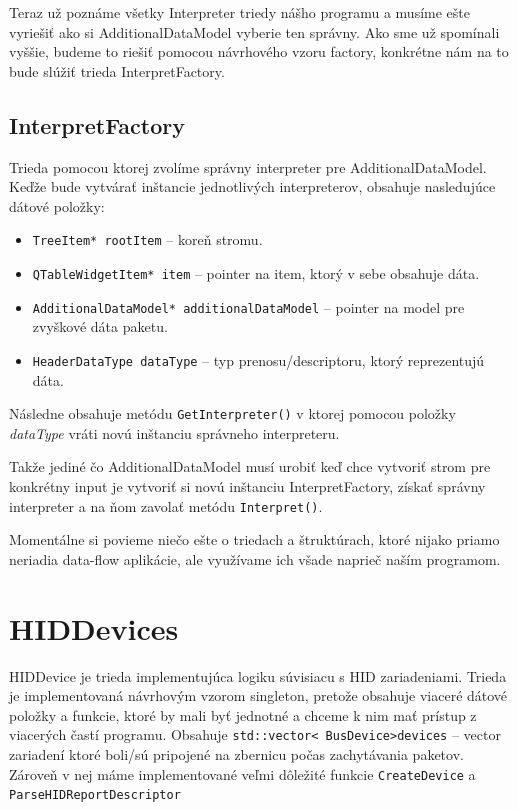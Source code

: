 Teraz už poznáme všetky Interpreter triedy nášho programu a musíme ešte vyriešiť ako si AdditionalDataModel vyberie ten správny. Ako sme už spomínali vyššie, budeme to riešiť pomocou návrhového vzoru factory, konkrétne nám na to bude slúžiť trieda InterpretFactory.

\subsection{InterpretFactory}
Trieda pomocou ktorej zvolíme správny interpreter pre AdditionalDataModel. Keďže bude vytvárať inštancie jednotlivých interpreterov, obsahuje nasledujúce dátové položky:
\begin{itemize}
\item \texttt{TreeItem* rootItem} -- koreň stromu.
\item \texttt{QTableWidgetItem* item} -- pointer na item, ktorý v sebe obsahuje dáta.
\item \texttt{AdditionalDataModel* additionalDataModel} -- pointer na model pre zvyškové dáta paketu.
\item \texttt{HeaderDataType dataType} -- typ prenosu/descriptoru, ktorý reprezentujú dáta.
\end{itemize}
Následne obsahuje metódu \texttt{GetInterpreter()} v ktorej pomocou položky \textit{dataType} vráti novú inštanciu správneho interpreteru. 

Takže jediné čo AdditionalDataModel musí urobiť keď chce vytvoriť strom pre konkrétny input je vytvoriť si novú inštanciu InterpretFactory, získať správny interpreter a na ňom zavolať metódu \texttt{Interpret()}.

Momentálne si povieme niečo ešte o triedach a štruktúrach, ktoré nijako priamo neriadia data-flow aplikácie, ale využívame ich všade naprieč naším programom.

\section{HIDDevices}
HIDDevice je trieda implementujúca logiku súvisiacu s HID zariadeniami. Trieda je implementovaná návrhovým vzorom singleton, pretože obsahuje viaceré dátové položky a funkcie, ktoré by mali byť jednotné a chceme k nim mať prístup z viacerých častí programu. Obsahuje \texttt{std::vector\textless~BusDevice\textgreater devices} -- vector zariadení ktoré boli/sú pripojené na zbernicu počas zachytávania paketov. Zároveň v nej máme implementované veľmi dôležité funkcie \texttt{CreateDevice} a \texttt{ParseHIDReportDescriptor}

